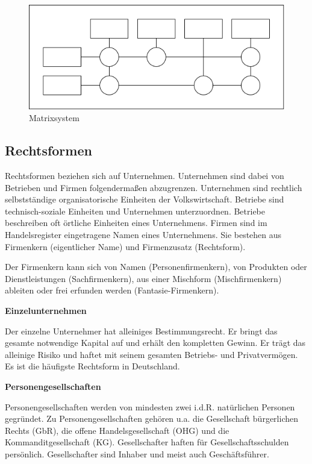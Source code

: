 \begin{figure}[H]
    \centering
    \includegraphics[width=\textwidth]{figures/matrixsystem.png}
    \caption{Matrixsystem}
    \label{fig:matrixsystem}
\end{figure}
\FloatBarrier

\subsection{Rechtsformen}

Rechtsformen beziehen sich auf Unternehmen. Unternehmen sind dabei von Betrieben und Firmen folgendermaßen abzugrenzen. Unternehmen sind rechtlich selbstständige organisatorische Einheiten der Volkswirtschaft. Betriebe sind technisch-soziale Einheiten und Unternehmen unterzuordnen. Betriebe beschreiben oft örtliche Einheiten eines Unternehmens. Firmen sind im Handelsregister eingetragene Namen eines Unternehmens. Sie bestehen aus Firmenkern (eigentlicher Name) und Firmenzusatz (Rechtsform).

Der Firmenkern kann sich von Namen (Personenfirmenkern), von Produkten oder Dienstleistungen (Sachfirmenkern), aus einer Mischform (Mischfirmenkern) ableiten oder frei erfunden werden (Fantasie-Firmenkern).

\textbf{Einzelunternehmen}

Der einzelne Unternehmer hat alleiniges Bestimmungsrecht. Er bringt das gesamte notwendige Kapital auf und erhält den kompletten Gewinn. Er trägt das alleinige Risiko und haftet mit seinem gesamten Betriebs- und Privatvermögen. Es ist die häufigste Rechtsform in Deutschland.

\textbf{Personengesellschaften}

Personengesellschaften werden von mindesten zwei i.d.R. natürlichen Personen gegründet. Zu Personengesellschaften gehören u.a. die Gesellschaft bürgerlichen Rechts (GbR), die offene Handelsgesellschaft (OHG) und die Kommanditgesellschaft (KG). Gesellschafter haften für Gesellschaftsschulden persönlich. Gesellschafter sind Inhaber und meist auch Geschäftsführer.

